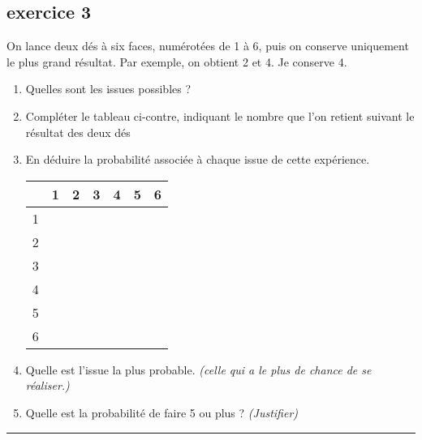 \documentclass[11pt]{article}
\newcommand{\horrule}[1]{\rule{\linewidth}{#1}} %
\begin{document}
\begin{multicols}{2}
  \subsection*{exercice 3}

  On lance deux dés à six faces, numérotées de 1 à 6, puis on conserve uniquement le plus grand résultat. Par exemple, on obtient 2 et 4. Je conserve 4.

  \begin{enumerate}
  \item Quelles sont les issues possibles ?
  \item Compléter le tableau ci-contre, indiquant le nombre que l’on retient suivant le résultat des deux dés
  \item En déduire la probabilité associée à chaque issue de cette expérience. 
    \begin{center}
      \begin{tabular}{|c|c|c|c|c|c|c|}
        \hline
        & 1 & 2 & 3 & 4 & 5 & 6 \\
        \hline
        1 &   &   &   &   &   &\\  
        \hline
        2 &   &   &   &   &   &\\  
        \hline
        3 &   &   &   &   &   &\\  
        \hline
        4 &   &   &   &   &   &\\  
        \hline
        5 &   &   &   &   &   &\\  
        \hline
        6 &   &   &   &   &   &\\
        \hline     
      \end{tabular}
    \end{center}
  \item Quelle est l'issue la plus probable. \textit{(celle qui a le plus de chance de se réaliser.)}
  \item Quelle est la probabilité de faire 5 ou plus ?  \textit{(Justifier)}
  \end{enumerate}
\end{multicols}

\vspace{-0.4cm}
\horrule{1px}
\vspace{-0.8cm}
\end{document}
